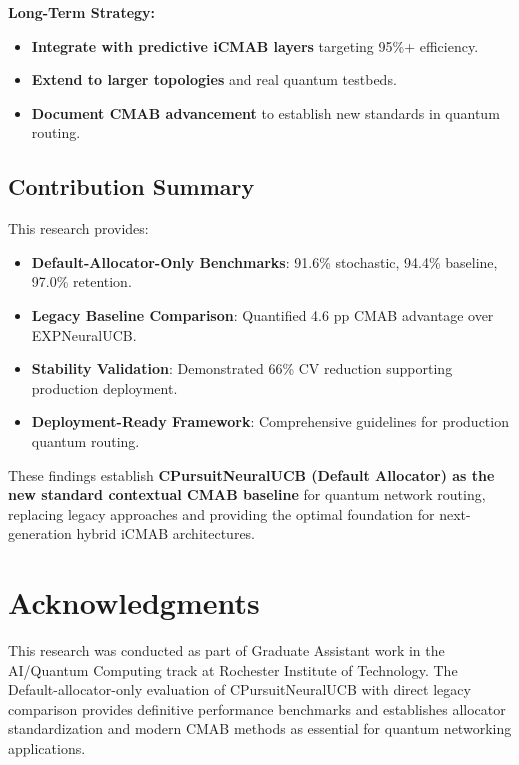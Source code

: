 \documentclass[12pt,a4paper]{article}
\newcommand{\success}[1]{\textcolor{accentgreen}{\textbf{#1}}}
\begin{document}
\textbf{Long-Term Strategy:}
\begin{itemize}
    \item \success{Integrate with predictive iCMAB layers} targeting 95\%+ efficiency.
    \item \success{Extend to larger topologies} and real quantum testbeds.
    \item \success{Document CMAB advancement} to establish new standards in quantum routing.
\end{itemize}

\subsection{Contribution Summary}

This research provides:

\begin{itemize}
    \item \success{\textbf{Default-Allocator-Only Benchmarks}}: 91.6\% stochastic, 94.4\% baseline, 97.0\% retention.
    
    \item \success{\textbf{Legacy Baseline Comparison}}: Quantified 4.6 pp CMAB advantage over EXPNeuralUCB.
    
    \item \success{\textbf{Stability Validation}}: Demonstrated 66\% CV reduction supporting production deployment.
    
    \item \success{\textbf{Deployment-Ready Framework}}: Comprehensive guidelines for production quantum routing.
\end{itemize}

These findings establish \success{\textbf{CPursuitNeuralUCB (Default Allocator) as the new standard contextual CMAB baseline}} for quantum network routing, replacing legacy approaches and providing the optimal foundation for next-generation hybrid iCMAB architectures.

\section{Acknowledgments}

This research was conducted as part of Graduate Assistant work in the AI/Quantum Computing track at Rochester Institute of Technology. The Default-allocator-only evaluation of CPursuitNeuralUCB with direct legacy comparison provides definitive performance benchmarks and establishes allocator standardization and modern CMAB methods as essential for quantum networking applications.
\end{document}
